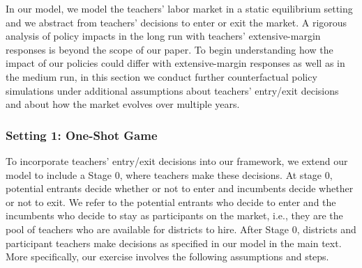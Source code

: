 \documentclass[notitlepage,12pt]{article}%
\begin{document}
In our model, we model the teachers' labor market in a static equilibrium
setting and we abstract from teachers' decisions to enter or exit the market.
A rigorous analysis of policy impacts in the long run with teachers'
extensive-margin responses is beyond the scope of our paper. To begin
understanding how the impact of our policies could differ with
extensive-margin responses as well as in the medium run, in this section we
conduct further counterfactual policy simulations under additional assumptions
about teachers' entry/exit decisions and about how the market evolves over
multiple years.

\subsubsection{Setting 1: One-Shot Game\label{oneshot}}

To incorporate teachers' entry/exit decisions into our framework, we extend
our model to include a Stage 0, where teachers make these decisions. At stage
0, potential entrants decide whether or not to enter and incumbents decide
whether or not to exit. We refer to the potential entrants who decide to enter
and the incumbents who decide to stay as participants on the market, i.e.,
they are the pool of teachers who are available for districts to hire. After
Stage 0, districts and participant teachers make decisions as specified in our
model in the main text. More specifically, our exercise involves the following
assumptions and steps.
\end{document}
